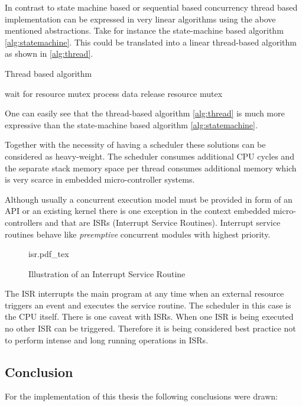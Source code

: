In contrast to state machine based or sequential based concurrency thread based implementation can be expressed in very linear algorithms using the above mentioned abstractions. Take for instance the state-machine based algorithm \ref{alg:statemachine}. This could be translated into a linear thread-based algorithm as shown in \ref{alg:thread}.

\begin{algorithm}[H]
\caption{Thread based algorithm}
\label{alg:thread}
\begin{algorithmic}
    \STATE wait for resource mutex
    \STATE process data
    \STATE release resource mutex
\ENDWHILE
\end{algorithmic}
\end{algorithm}

One can easily see that the thread-based algorithm \ref{alg:thread} is much more expressive than the state-machine based algorithm \ref{alg:statemachine}.

Together with the necessity of having a scheduler these solutions can be considered as heavy-weight. The scheduler consumes additional CPU cycles and the separate stack memory space per thread consumes additional memory which is very scarce in embedded micro-controller systems.

Although usually a concurrent execution model must be provided in form of an API or an existing kernel there is one exception in the context embedded micro-controllers and that are ISRs (Interrupt Service Routines). Interrupt service routines behave like \emph{preemptive} concurrent modules with highest priority.

\begin{figure}[H]
\centering
{isr.pdf_tex}
\caption{Illustration of an Interrupt Service Routine}
\end{figure}

The ISR interrupts the main program at any time when an external resource triggers an event and executes the service routine. The scheduler in this case is the CPU itself. There is one caveat with ISRs. When one ISR is being executed no other ISR can be triggered. Therefore it is being considered best practice not to perform intense and long running operations in ISRs.

\subsection{Conclusion}%
For the implementation of this thesis the following conclusions were drawn:


